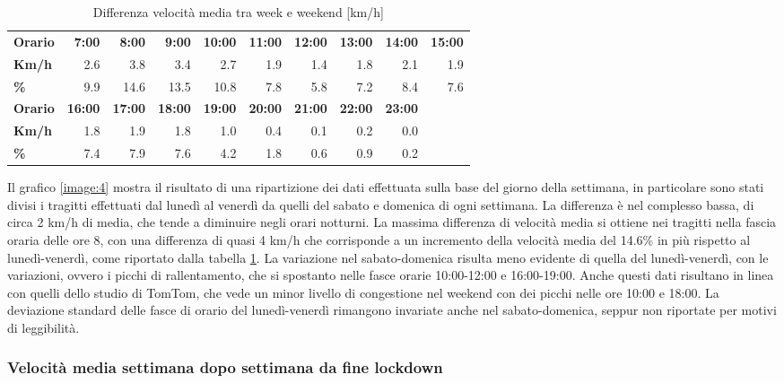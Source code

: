 \begin{table}[H]
\centering
\begin{tabular}{ | l r r r r r r r r r | }
\hline
\textbf{Orario} & \textbf{7:00} & \textbf{8:00} & \textbf{9:00} & \textbf{10:00} & \textbf{11:00} & \textbf{12:00} & \textbf{13:00} & \textbf{14:00} & \textbf{15:00} \\
\textbf{Km/h}& 2.6 & 3.8 & 3.4 & 2.7 & 1.9 & 1.4 & 1.8 & 2.1 & 1.9 \\
\textbf{\%}    & 9.9 & 14.6  & 13.5 & 10.8 & 7.8 & 5.8 & 7.2 & 8.4 & 7.6 \\
\hline
\textbf{Orario} & \textbf{16:00} & \textbf{17:00} & \textbf{18:00} & \textbf{19:00} & \textbf{20:00} & \textbf{21:00} & \textbf{22:00} & \textbf{23:00} & \quad \\
\textbf{Km/h}&  1.8 & 1.9 & 1.8 & 1.0 & 0.4 & 0.1 & 0.2 & 0.0 & \quad \\
\textbf{\%}    & 7.4 & 7.9 & 7.6 & 4.2 & 1.8 & 0.6 & 0.9 & 0.2 & \quad \\
\hline
\end{tabular}
\caption{Differenza velocità media tra week e weekend [km/h]}
\label{table:8}
\end{table}

Il grafico \ref{image:4} mostra il risultato di una ripartizione dei dati effettuata sulla base del giorno della settimana, in particolare sono stati divisi i tragitti effettuati dal lunedì al venerdì da quelli del sabato e domenica di ogni settimana. La differenza è nel complesso bassa, di circa 2 km/h di media, che tende a diminuire negli orari notturni. La massima differenza di velocità media si ottiene nei tragitti nella fascia oraria delle ore 8, con una differenza di quasi 4 km/h che corrisponde a un incremento della velocità media del 14.6\% in più rispetto al lunedì-venerdì, come riportato dalla tabella \ref{table:8}. La variazione nel sabato-domenica risulta meno evidente di quella del lunedì-venerdì, con le variazioni, ovvero i picchi di rallentamento, che si spostanto nelle fasce orarie 10:00-12:00 e 16:00-19:00. Anche questi dati risultano in linea con quelli dello studio di TomTom\cite{tomtomindexmilan}, che vede un minor livello di congestione nel weekend con dei picchi nelle ore 10:00 e 18:00. La deviazione standard delle fasce di orario del lunedì-venerdì rimangono invariate anche nel sabato-domenica, seppur non riportate per motivi di leggibilità.

\subsubsection{Velocità media settimana dopo settimana da fine lockdown}

